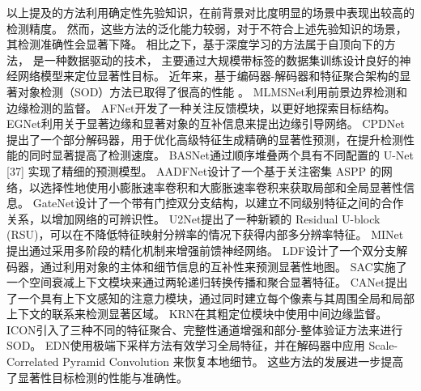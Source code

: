 以上提及的方法利用确定性先验知识，在前背景对比度明显的场景中表现出较高的检测精度。
然而，这些方法的泛化能力较弱，对于不符合上述先验知识的场景，其检测准确性会显著下降。
相比之下，基于深度学习的方法属于自顶向下的方法，
是一种数据驱动的技术，
主要通过大规模带标签的数据集训练设计良好的神经网络模型来定位显著性目标。
近年来，基于编码器-解码器和特征聚合架构的显著对象检测（SOD）方法已取得了很高的性能
。
MLMSNet利用前景边界检测和边缘检测的监督。
AFNet开发了一种关注反馈模块，以更好地探索目标结构。
EGNet利用关于显著边缘和显著对象的互补信息来提出边缘引导网络。
CPDNet提出了一个部分解码器，用于优化高级特征生成精确的显著性预测，在提升检测性能的同时显著提高了检测速度。
BASNet通过顺序堆叠两个具有不同配置的 U-Net [37] 实现了精细的预测模型。
AADFNet设计了一个基于关注密集 ASPP 的网络，以选择性地使用小膨胀速率卷积和大膨胀速率卷积来获取局部和全局显著性信息。
GateNet设计了一个带有门控双分支结构，以建立不同级别特征之间的合作关系，以增加网络的可辨识性。
U2Net提出了一种新颖的 Residual U-block (RSU)，可以在不降低特征映射分辨率的情况下获得内部多分辨率特征。
MINet提出通过采用多阶段的精化机制来增强前馈神经网络。
LDF设计了一个双分支解码器，通过利用对象的主体和细节信息的互补性来预测显著性地图。
SAC实施了一个空间衰减上下文模块来通过两轮递归转换传播和聚合显著特征。
CANet提出了一个具有上下文感知的注意力模块，通过同时建立每个像素与其周围全局和局部上下文的联系来检测显著区域。
KRN在其粗定位模块中使用中间边缘监督。
ICON引入了三种不同的特征聚合、完整性通道增强和部分-整体验证方法来进行 SOD。
EDN使用极端下采样方法有效学习全局特征，并在解码器中应用 Scale-Correlated Pyramid Convolution 来恢复本地细节。
这些方法的发展进一步提高了显著性目标检测的性能与准确性。







\label{chpt1:title:rgbd_methods}

